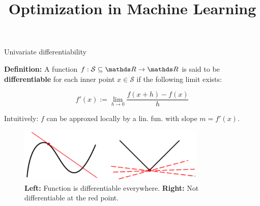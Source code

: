 \documentclass[11pt,compress,t,notes=noshow, xcolor=table]{beamer}
\title{Optimization in Machine Learning}
\date{}
\begin{document}
\sloppy



\begin{vbframe}{Univariate differentiability}

\textbf{Definition:} A function $f: \mathcal{S} \subseteq \R \to \R$ is said to be \textbf{differentiable} for each inner point $x \in \mathcal{S}$ if the following limit exists:

$$
f'(x) := \lim_{h \to 0} \frac{f(x + h) - f(x)}{h}
$$

Intuitively: $f$ can be approxed locally by a lin. fun. with slope $m = f'(x)$. 

\begin{figure}
    \centering
    \includegraphics[width = 0.8\textwidth]{figure_man/tangent.png}
    \caption*{\footnotesize \textbf{Left:} Function is differentiable everywhere.
        \textbf{Right:} Not differentiable at the red point. }
\end{figure}








\end{vbframe}
\end{document}
